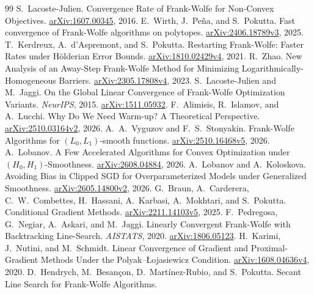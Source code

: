 \documentclass[11pt]{article}
\begin{document}
\appendix


\begin{thebibliography}{99}
 S.~Lacoste-Julien.
Convergence Rate of Frank-Wolfe for Non-Convex Objectives.
\href{https://arxiv.org/abs/1607.00345}{arXiv:1607.00345}, 2016.
 E.~Wirth, J.~Pe\~na, and S.~Pokutta.
Fast convergence of Frank-Wolfe algorithms on polytopes.
\href{https://arxiv.org/abs/2406.18789v3}{arXiv:2406.18789v3}, 2025.
 T.~Kerdreux, A.~d'Aspremont, and S.~Pokutta.
Restarting Frank-Wolfe: Faster Rates under H\"olderian Error Bounds.
\href{https://arxiv.org/abs/1810.02429v4}{arXiv:1810.02429v4}, 2021.
 R.~Zhao.
New Analysis of an Away-Step Frank-Wolfe Method for Minimizing
Logarithmically-Homogeneous Barriers.
\href{https://arxiv.org/html/2305.17808v4}{arXiv:2305.17808v4}, 2023.
 S.~Lacoste-Julien and M.~Jaggi.
On the Global Linear Convergence of Frank-Wolfe Optimization Variants.
\emph{NeurIPS}, 2015.
\href{https://arxiv.org/abs/1511.05932}{arXiv:1511.05932}.
 F.~Alimisis, R.~Islamov, and A.~Lucchi.
Why Do We Need Warm-up? A Theoretical Perspective.
\href{https://arxiv.org/abs/2510.03164v2}{arXiv:2510.03164v2}, 2026.
 A.~A.~Vyguzov and F.~S.~Stonyakin.
Frank-Wolfe Algorithms for $(L_0,L_1)$-smooth functions.
\href{https://arxiv.org/abs/2510.16468v5}{arXiv:2510.16468v5}, 2026.
 A.~Lobanov.
A Few Accelerated Algorithms for Convex Optimization under $(H_0,H_1)$-Smoothness.
\href{https://arxiv.org/abs/2608.04884}{arXiv:2608.04884}, 2026.
 A.~Lobanov and A.~Koloskova.
Avoiding Bias in Clipped SGD for Overparameterized Models under Generalized Smoothness.
\href{https://arxiv.org/abs/2605.14800v2}{arXiv:2605.14800v2}, 2026.
 G.~Braun, A.~Carderera, C.~W.~Combettes, H.~Hassani,
A.~Karbasi, A.~Mokhtari, and S.~Pokutta. Conditional Gradient Methods.
\href{https://arxiv.org/abs/2211.14103v5}{arXiv:2211.14103v5}, 2025.
 F.~Pedregosa, G.~Negiar, A.~Askari, and M.~Jaggi.
Linearly Convergent Frank-Wolfe with Backtracking Line-Search.
\emph{AISTATS}, 2020. \href{https://arxiv.org/abs/1806.05123}{arXiv:1806.05123}.
 H.~Karimi, J.~Nutini, and M.~Schmidt.
Linear Convergence of Gradient and Proximal-Gradient Methods Under the
Polyak--{\L}ojasiewicz Condition.
\href{https://arxiv.org/abs/1608.04636v4}{arXiv:1608.04636v4}, 2020.
 D.~Hendrych, M.~Besan\c{c}on, D.~Mart\'inez-Rubio, and S.~Pokutta.
Secant Line Search for Frank-Wolfe Algorithms.

\end{thebibliography}
\end{document}

